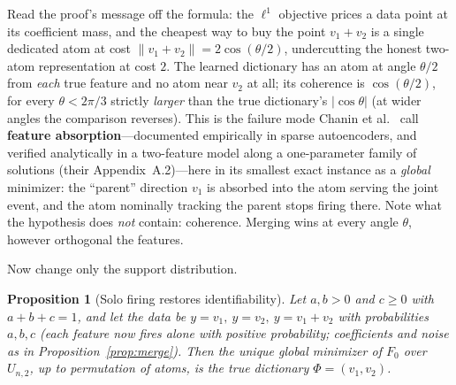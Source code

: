 \documentclass[11pt]{amsart}
\theoremstyle{plain}
\newtheorem{proposition}[theorem]{Proposition}
\theoremstyle{definition}
\begin{document}
Read the proof's message off the formula: the $\ell^1$ objective prices a data point at its coefficient mass, and the cheapest way to buy the point $v_1+v_2$ is a single dedicated atom at cost $\lVert v_1+v_2\rVert=2\cos(\theta/2)$, undercutting the honest two-atom representation at cost $2$. The learned dictionary has an atom at angle $\theta/2$ from \emph{each} true feature and no atom near $v_2$ at all; its coherence is $\cos(\theta/2)$, for every $\theta<2\pi/3$ strictly \emph{larger} than the true dictionary's $\lvert\cos\theta\rvert$ (at wider angles the comparison reverses). This is the failure mode Chanin et al.~\cite{chanin2024} call \textbf{feature absorption}---documented empirically in sparse autoencoders, and verified analytically in a two-feature model along a one-parameter family of solutions (their Appendix~A.2)---here in its smallest exact instance as a \emph{global} minimizer: the ``parent'' direction $v_1$ is absorbed into the atom serving the joint event, and the atom nominally tracking the parent stops firing there. Note what the hypothesis does \emph{not} contain: coherence. Merging wins at every angle $\theta$, however orthogonal the features.

Now change only the support distribution.

\begin{proposition}[Solo firing restores identifiability]\label{prop:recover}
Let $a,b>0$ and $c\ge0$ with $a+b+c=1$, and let the data be $y=v_1,\ y=v_2,\ y=v_1+v_2$ with probabilities $a,b,c$ (each feature now fires alone with positive probability; coefficients and noise as in Proposition~\ref{prop:merge}). Then the unique global minimizer of $F_0$ over $U_{n,2}$, up to permutation of atoms, is the true dictionary $\Phi=(v_1,v_2)$.
\end{proposition}
\end{document}
